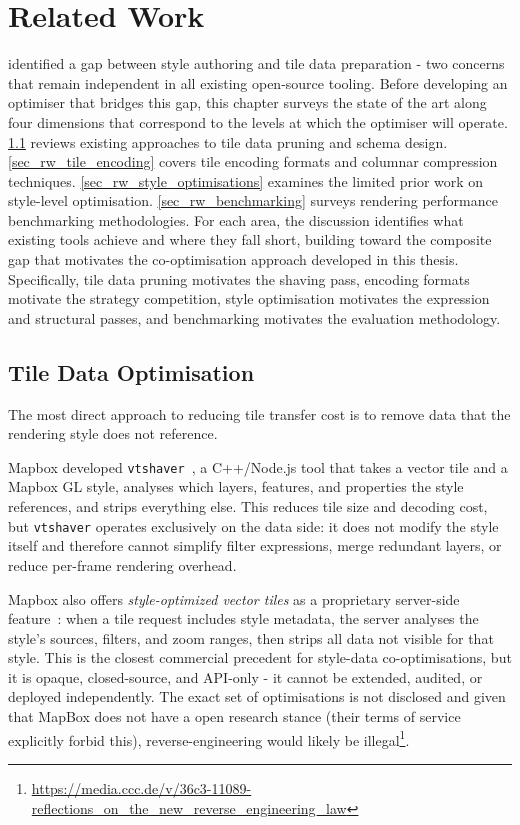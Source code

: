 \chapter{Related Work}\label{ch_related_work}

 identified a gap between style authoring and tile data preparation - two concerns that remain independent in all existing open-source tooling.
Before developing an optimiser that bridges this gap, this chapter surveys the state of the art along four dimensions that correspond to the levels at which the optimiser will operate.
\cref{sec_rw_tile_data} reviews existing approaches to tile data pruning and schema design.
\cref{sec_rw_tile_encoding} covers tile encoding formats and columnar compression techniques.
\cref{sec_rw_style_optimisations} examines the limited prior work on style-level optimisation.
\cref{sec_rw_benchmarking} surveys rendering performance benchmarking methodologies.
For each area, the discussion identifies what existing tools achieve and where they fall short, building toward the composite gap that motivates the co-optimisation approach developed in this thesis.
Specifically, tile data pruning motivates the shaving pass, encoding formats motivate the strategy competition, style optimisation motivates the expression and structural passes, and benchmarking motivates the evaluation methodology.

\section{Tile Data Optimisation}\label{sec_rw_tile_data}

The most direct approach to reducing tile transfer cost is to remove data that the rendering style does not reference.

Mapbox developed \texttt{vtshaver}~\cite{mapboxVtshaverTileShaving2018}, a C++/Node.js tool that takes a vector tile and a Mapbox GL style, analyses which layers, features, and properties the style references, and strips everything else.
This reduces tile size and decoding cost, but \texttt{vtshaver} operates exclusively on the data side:
it does not modify the style itself and therefore cannot simplify filter expressions, merge redundant layers, or reduce per-frame rendering overhead.

Mapbox also offers \emph{style-optimized vector tiles} as a proprietary server-side feature~\cite{StyleoptimizedVectorTiles}: when a tile request includes style metadata, the server analyses the style's sources, filters, and zoom ranges, then strips all data not visible for that style.
This is the closest commercial precedent for style-data co-optimisations, but it is opaque, closed-source, and API-only - it cannot be extended, audited, or deployed independently.
The exact set of optimisations is not disclosed and given that MapBox does not have a open research stance (their terms of service explicitly forbid this), reverse-engineering would likely be illegal\footnote{\url{https://media.ccc.de/v/36c3-11089-reflections_on_the_new_reverse_engineering_law}}.

